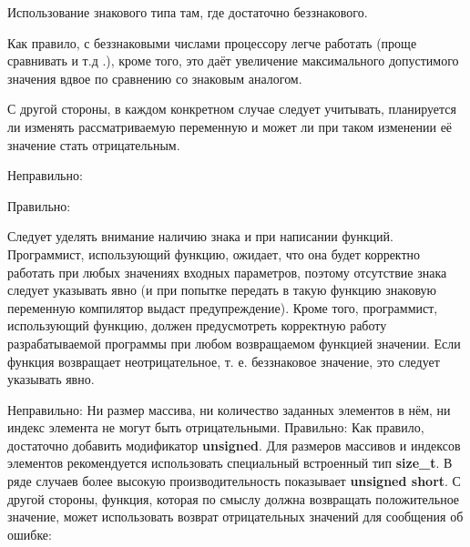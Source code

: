 \begin{typerror}
	Использование знакового типа там, где достаточно беззнакового.

	Как правило, с беззнаковыми числами процессору легче работать (проще сравнивать и т.д .), кроме того, это даёт увеличение максимального допустимого значения вдвое по сравнению со знаковым аналогом.

	С другой стороны, в каждом конкретном случае следует учитывать, планируется ли изменять рассматриваемую переменную и может ли при таком изменении её значение стать отрицательным.

	Неправильно:

	Правильно:


	Следует уделять внимание наличию знака и при написании функций.
	Программист, использующий функцию, ожидает, что она будет корректно работать при любых значениях входных параметров, поэтому отсутствие знака следует указывать явно (и при попытке передать в такую функцию знаковую переменную компилятор выдаст предупреждение).
	Кроме того, программист, использующий функцию, должен предусмотреть корректную работу разрабатываемой программы при любом возвращаемом функцией значении.
	Если функция возвращает неотрицательное, т. е. беззнаковое значение, это следует указывать явно.

	Неправильно:
	Ни размер массива, ни количество заданных элементов в нём, ни индекс элемента не могут быть отрицательными.
	Правильно:
	Как правило, достаточно добавить модификатор \textbf{unsigned}.
	Для размеров массивов и индексов элементов рекомендуется использовать специальный встроенный тип \textbf{size\_t}.
	В ряде случаев более высокую производительность показывает \textbf{unsigned short}.
	С  другой стороны, функция, которая по смыслу должна возвращать положительное значение, может использовать возврат отрицательных значений для сообщения об ошибке:

	
\end{typerror}
